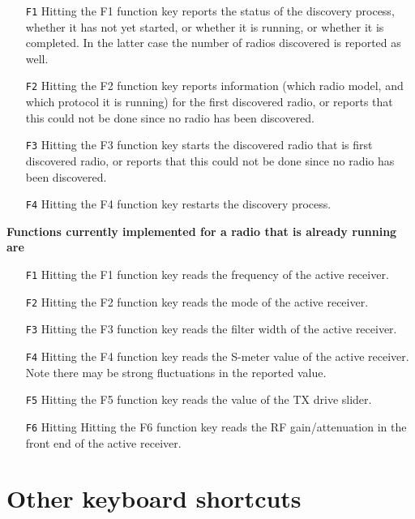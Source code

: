 \documentclass[12pt]{book}
\def\rett#1{\texttt{\color{red}#1}}
\begin{document}
\begin{itemize}
\item[\rett{F1}]{Hitting the F1 function key reports the status of the discovery process,
whether it has not yet started, or whether it is running, or whether it is completed.
In the latter case the number of radios discovered is reported as well.}

\item[\rett{F2}]{Hitting the F2 function key reports information (which radio model, and
which protocol it is running) for the first discovered radio,
or reports that  this could not be done since no radio has been
discovered.}

\item[\rett{F3}]{Hitting the F3 function key starts the discovered radio that is first
discovered radio, or reports that  this could not be done since no radio has been
discovered.}
\item[\rett{F4}]{Hitting the F4 function key restarts the discovery process.}
\end{itemize}

\textbf{Functions currently implemented for a radio that is  already running are}

\begin{itemize}
\item[\rett{F1}]{Hitting the F1 function key reads the frequency of the active receiver.}

\item[\rett{F2}]{Hitting the F2 function key reads the mode of the active receiver.}

\item[\rett{F3}]{Hitting the F3 function key reads the filter width of the active receiver.}

\item[\rett{F4}]{Hitting the F4 function key reads the S-meter value of the active receiver.
Note there may be strong fluctuations in the reported value.}

\item[\rett{F5}]{Hitting the F5 function key reads the value of the TX drive slider.}

\item[\rett{F6}]{Hitting Hitting the F6 function key reads the RF gain/attenuation in the front
end of the active receiver.}
\end{itemize}

\section{Other keyboard shortcuts}
\end{document}

